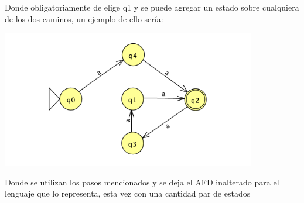 \documentclass[11pt,letterpaper]{article}
\begin{document}
Donde obligatoriamente de elige q1 y se puede agregar un estado sobre cualquiera de los dos caminos, un ejemplo de ello sería:
\begin{center}
\includegraphics[height=6cm]{tarea_5-c3.png}
\end{center}

Donde se utilizan los pasos mencionados y se deja
el AFD inalterado para el lenguaje que lo representa, esta vez con una cantidad par de estados
\end{document}
